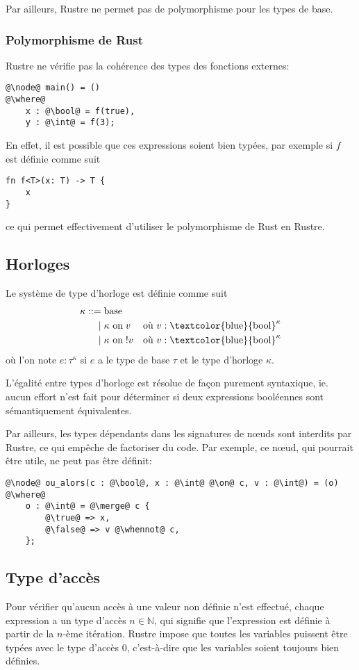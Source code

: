 \documentclass{scrartcl}
\newcommand{\type}[1]{\textcolor{blue}{#1}}
\newcommand{\bool}{\type{bool}}
\begin{document}
Par ailleurs, Rustre ne permet pas de polymorphisme pour les types de base.

\subsubsection{Polymorphisme de Rust}
Rustre ne vérifie pas la cohérence des types des fonctions externes:
\begin{verbatim}
@\node@ main() = ()
@\where@
    x : @\bool@ = f(true),
    y : @\int@ = f(3);
\end{verbatim}
En effet, il est possible que ces expressions soient bien typées, par exemple si \(f\) est
définie comme suit
\begin{verbatim}
fn f<T>(x: T) -> T {
    x
}
\end{verbatim}
ce qui permet effectivement d'utiliser le polymorphisme de Rust en Rustre.

\subsection{Horloges}
Le système de type d'horloge est définie comme suit
\begin{align*}
  \kappa ::=&\; \textrm{base}\\
  |&\; \kappa\ \textrm{on}\; v & \textrm{où }v : \textrm{\bool}^\kappa\\
  |&\; \kappa\ \textrm{on}\; !v & \textrm{où }v : \textrm{\bool}^\kappa
\end{align*}
où l'on note \(e : \tau^\kappa\) si \(e\) a le type de base \(\tau\) et le type d'horloge
\(\kappa\).

L'égalité entre types d'horloge est résolue de façon purement syntaxique, ie. aucun effort n'est
fait pour déterminer si deux expressions booléennes sont sémantiquement équivalentes.

Par ailleurs, les types dépendants dans les signatures de n\oe{}uds sont interdits par Rustre, ce
qui empêche de factoriser du code. Par exemple, ce n\oe{}ud, qui pourrait être utile, ne peut pas
être définit:
\begin{verbatim}
@\node@ ou_alors(c : @\bool@, x : @\int@ @\on@ c, v : @\int@) = (o)
@\where@
    o : @\int@ = @\merge@ c {
        @\true@ => x,
        @\false@ => v @\whennot@ c,
    };
\end{verbatim}

\subsection{Type d'accès}
Pour vérifier qu'aucun accès à une valeur non définie n'est effectué, chaque expression a un type
d'accès \(n\in\mathbb{N}\), qui signifie que l'expression est définie à partir de la \(n\)-ème
itération. Rustre impose que toutes les variables puissent être typées avec le type d'accès
\(0\), c'est-à-dire que les variables soient toujours bien définies.
\end{document}
